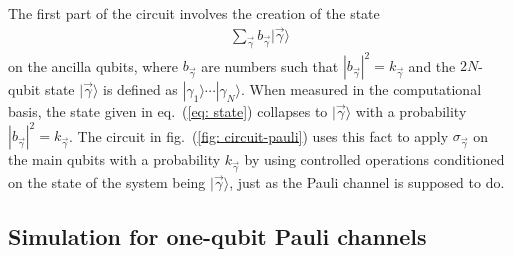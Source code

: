 \documentclass[10pt,letterpaper]{article} %
\begin{document}
The first part of the circuit involves the creation of the state
\begin{eqnarray}
\label{eq: state}
\sum_{\vec{\gamma}} b_{\vec{\gamma}} |\vec{\gamma} \rangle
\end{eqnarray}
on the ancilla qubits, where $b_{\vec{\gamma}}$ are numbers such that $
|b_{\vec{\gamma}}|^2 = k_{\vec{\gamma}}$ and
the $2N$-qubit state $|\vec{\gamma}\rangle$ is defined as $|\gamma_1\rangle
\cdots |\gamma_N\rangle$.
When measured in the computational basis, the state given in eq.~(\ref{eq: state})
collapses to $|\vec{\gamma}\rangle$ with a 
probability $|b_{\vec{\gamma}}|^2 = k_{\vec\gamma}$. 
The circuit in fig.~(\ref{fig: circuit-pauli}) uses this fact
to apply $\sigma_{\vec{\gamma}}$ on the main qubits
with a probability $k_{\vec\gamma}$ by using controlled operations 
conditioned on the state of the system being $|\vec{\gamma}\rangle$,
just as the Pauli channel is supposed to do.  
% 
% 

 


\subsection{Simulation for one-qubit Pauli channels} %
\label{subsec: Simulation for one-qubit Pauli channels}


\end{document}
